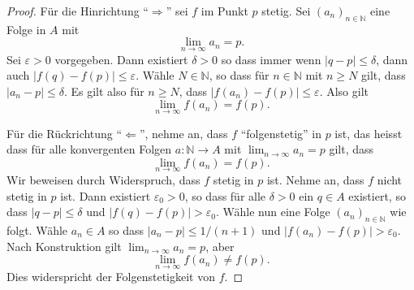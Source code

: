 \documentclass[../main.tex]{subfiles}
\begin{document}
\begin{proof}
  Für die Hinrichtung ``$\Rightarrow$'' sei $f$
  im Punkt $p$ stetig. Sei ${(a_{n})}_{n \in \mathbb{N}}$ 
  eine Folge in $A$ mit
  \[
    \lim_{n \to \infty} a_n = p.
  \]
  Sei $\varepsilon > 0$ vorgegeben.
  Dann existiert $\delta > 0$ so dass immer wenn
  $|q - p| \leq \delta$, dann auch
  $|f(q) - f(p)| \leq \varepsilon$.
  Wähle $N \in \mathbb{N}$, so
  dass für $n \in \mathbb{N}$ mit $n \geq N$ gilt,
  dass $|a_n - p| \leq \delta$.
  Es gilt also für $n \geq N$, dass
  $|f(a_n) - f(p)| \leq \varepsilon$.
  Also gilt
  \[
    \lim_{n \to \infty} f(a_n) = f(p).
  \]
  
  Für die Rückrichtung ``$\Leftarrow$'', nehme an,
  dass $f$ ``folgenstetig'' in $p$ ist,
  das heisst dass für alle
  konvergenten Folgen $a \colon \mathbb{N} \to A$
  mit $\lim_{n \to \infty} a_n = p$ gilt,
  dass
  \[
    \lim_{n \to \infty} f(a_n) = f(p).
  \]
  Wir beweisen durch Widerspruch, dass
  $f$ stetig in $p$ ist.
  Nehme an, dass $f$ nicht stetig in $p$ ist.
  Dann existiert $\varepsilon_0 > 0$, so dass
  für alle $\delta > 0$ ein $q \in A$ 
  existiert, so dass
  $|q - p| \leq \delta$ und $|f(q) - f(p)| > \varepsilon_0$.
  Wähle nun eine Folge
  ${(a_{n})}_{n \in \mathbb{N}}$ wie folgt.
  Wähle $a_n \in A$ so dass
  $|a_n - p| \leq 1/(n+1)$ und $|f(a_n) - f(p)| > \varepsilon_0$.
  Nach Konstruktion gilt
  $\lim_{n \to \infty} a_n = p$, aber
  \[
    \lim_{n \to \infty} f(a_n) \neq f(p).
  \]
  Dies widerspricht der Folgenstetigkeit von $f$.
\end{proof}
\end{document}
